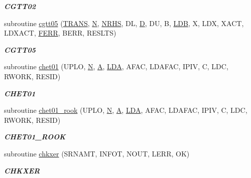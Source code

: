 \begin{DoxyCompactItemize}
\begin{DoxyCompactList}\small\item\em {\bfseries C\+G\+T\+T02} \end{DoxyCompactList}\item 
subroutine \hyperlink{group__complex__lin_ga77381c0956c22456a980a4922446ab94}{cgtt05} (\hyperlink{superlu__enum__consts_8h_a0c4e17b2d5cea33f9991ccc6a6678d62a1f61e3015bfe0f0c2c3fda4c5a0cdf58}{T\+R\+A\+N\+S}, \hyperlink{polmisc_8c_a0240ac851181b84ac374872dc5434ee4}{N}, \hyperlink{example__user_8c_aa0138da002ce2a90360df2f521eb3198}{N\+R\+H\+S}, D\+L, \hyperlink{odrpack_8h_a7dae6ea403d00f3687f24a874e67d139}{D}, D\+U, B, \hyperlink{example__user_8c_a50e90a7104df172b5a89a06c47fcca04}{L\+D\+B}, X, L\+D\+X, X\+A\+C\+T, L\+D\+X\+A\+C\+T, \hyperlink{superlu__enum__consts_8h_af00a42ecad444bbda75cde1b64bd7e72a78fd14d7abebae04095cfbe02928f153}{F\+E\+R\+R}, B\+E\+R\+R, R\+E\+S\+L\+T\+S)
\begin{DoxyCompactList}\small\item\em {\bfseries C\+G\+T\+T05} \end{DoxyCompactList}\item 
subroutine \hyperlink{group__complex__lin_ga7f4ddd284fa0421ed45839fa4b64512d}{chet01} (U\+P\+L\+O, \hyperlink{polmisc_8c_a0240ac851181b84ac374872dc5434ee4}{N}, \hyperlink{classA}{A}, \hyperlink{example__user_8c_ae946da542ce0db94dced19b2ecefd1aa}{L\+D\+A}, A\+F\+A\+C, L\+D\+A\+F\+A\+C, I\+P\+I\+V, C, L\+D\+C, R\+W\+O\+R\+K, R\+E\+S\+I\+D)
\begin{DoxyCompactList}\small\item\em {\bfseries C\+H\+E\+T01} \end{DoxyCompactList}\item 
subroutine \hyperlink{group__complex__lin_ga16f1a255f82047e289c2d4d954417db7}{chet01\+\_\+rook} (U\+P\+L\+O, \hyperlink{polmisc_8c_a0240ac851181b84ac374872dc5434ee4}{N}, \hyperlink{classA}{A}, \hyperlink{example__user_8c_ae946da542ce0db94dced19b2ecefd1aa}{L\+D\+A}, A\+F\+A\+C, L\+D\+A\+F\+A\+C, I\+P\+I\+V, C, L\+D\+C, R\+W\+O\+R\+K, R\+E\+S\+I\+D)
\begin{DoxyCompactList}\small\item\em {\bfseries C\+H\+E\+T01\+\_\+\+R\+O\+O\+K} \end{DoxyCompactList}\item 
subroutine \hyperlink{group__complex__lin_gaf0279384c87f94223fdf27a4d97f4f7d}{chkxer} (S\+R\+N\+A\+M\+T, I\+N\+F\+O\+T, N\+O\+U\+T, L\+E\+R\+R, O\+K)
\begin{DoxyCompactList}\small\item\em {\bfseries C\+H\+K\+X\+E\+R} \end{DoxyCompactList}\item 

\end{DoxyCompactItemize}
